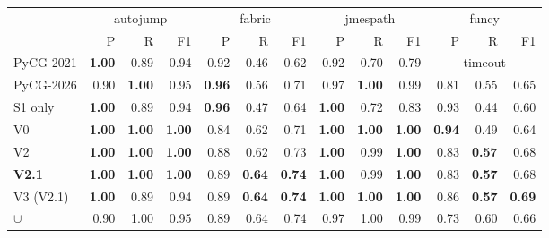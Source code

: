 \begin{tabular}{l rrr rrr rrr rrr }
\toprule
& \multicolumn{3}{c}{autojump} & \multicolumn{3}{c}{fabric} & \multicolumn{3}{c}{jmespath} & \multicolumn{3}{c}{funcy}\\
\cmidrule(lr){2-4}\cmidrule(lr){5-7}\cmidrule(lr){8-10}\cmidrule(lr){11-13}
& P & R & F1 & P & R & F1 & P & R & F1 & P & R & F1\\
\midrule
PyCG-2021 & \textbf{1.00} & 0.89 & 0.94 & 0.92 & 0.46 & 0.62 & 0.92 & 0.70 & 0.79 & \multicolumn{3}{c}{timeout} \\
PyCG-2026 & 0.90 & \textbf{1.00} & 0.95 & \textbf{0.96} & 0.56 & 0.71 & 0.97 & \textbf{1.00} & 0.99 & 0.81 & 0.55 & 0.65 \\
S1 only & \textbf{1.00} & 0.89 & 0.94 & \textbf{0.96} & 0.47 & 0.64 & \textbf{1.00} & 0.72 & 0.83 & 0.93 & 0.44 & 0.60 \\
V0 & \textbf{1.00} & \textbf{1.00} & \textbf{1.00} & 0.84 & 0.62 & 0.71 & \textbf{1.00} & \textbf{1.00} & \textbf{1.00} & \textbf{0.94} & 0.49 & 0.64 \\
V2 & \textbf{1.00} & \textbf{1.00} & \textbf{1.00} & 0.88 & 0.62 & 0.73 & \textbf{1.00} & 0.99 & \textbf{1.00} & 0.83 & \textbf{0.57} & 0.68 \\
\textbf{V2.1} & \textbf{1.00} & \textbf{1.00} & \textbf{1.00} & 0.89 & \textbf{0.64} & \textbf{0.74} & \textbf{1.00} & 0.99 & \textbf{1.00} & 0.83 & \textbf{0.57} & 0.68 \\
V3 (V2.1) & \textbf{1.00} & 0.89 & 0.94 & 0.89 & \textbf{0.64} & \textbf{0.74} & \textbf{1.00} & \textbf{1.00} & \textbf{1.00} & 0.86 & \textbf{0.57} & \textbf{0.69} \\
$\cup$ & 0.90 & 1.00 & 0.95 & 0.89 & 0.64 & 0.74 & 0.97 & 1.00 & 0.99 & 0.73 & 0.60 & 0.66 \\
\bottomrule
\end{tabular}
